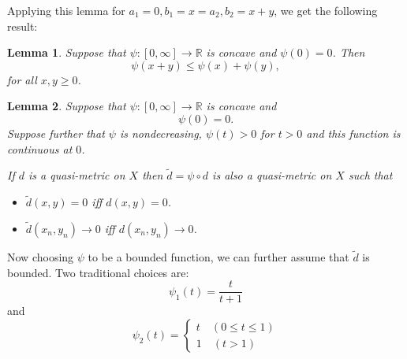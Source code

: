 \documentclass{article} %
\newtheorem{lemma}{Lemma}
\begin{document}
Applying this lemma for $a_1 =0, b_1=x = a_2, b_2=x+y$, we get the following result:
\begin{lemma}
    Suppose that $\psi \colon [0,\infty] \to \mathbb{R}$ is concave and $\psi(0)=0$. Then
    \[ \psi(x+y) \le \psi(x) + \psi(y),\]
    for all $x,y \ge 0$.
\end{lemma}
\begin{lemma}
    Suppose that $\psi \colon [0,\infty] \to \mathbb{R}$ is concave and
    \[\psi(0)=0.\]
    Suppose further that $\psi$ is nondecreasing, $\psi(t) >0$ for $t >0$ and this function is continuous at $0$.

    If $d$ is a quasi-metric on $X$ then $\tilde{d} = \psi \circ d$ is also a quasi-metric on $X$
    such that
    \begin{itemize}
        \item $\tilde{d}(x,y)=0$ iff $d(x,y)=0$.
        \item $\tilde{d}(x_n,y_n) \to 0$ iff $d(x_n,y_n) \to 0$.
    \end{itemize}
\end{lemma}
Now choosing $\psi$ to be a bounded function, we can further assume that $\tilde{d}$ is bounded. Two traditional choices are:
\[ \psi_1(t)= \dfrac{t}{t+1}\]
and
\[\psi_2(t) = \begin{cases}
        t \quad (0 \le t \le 1) \\
        1 \quad (t >1)
    \end{cases}\]
\end{document}

